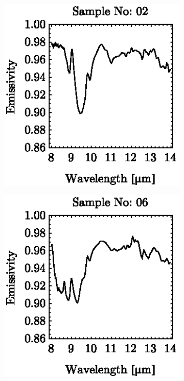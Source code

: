 \begin{figure}[!t]
	\centering
	\vspace{1em}
	\begin{subfigure}[t]{.3\linewidth}
		\centering
		\includegraphics[scale=1]{pics/Chapter_05/Sample_no_02.eps}
		\caption{}
	\end{subfigure}
	\hspace{1em}
	\begin{subfigure}[t]{.3\linewidth}
		\centering
		\includegraphics[scale=1]{pics/Chapter_05/Sample_no_06.eps}
		\caption{}
	\end{subfigure}
	\hspace{1em}
	\begin{subfigure}[t]{.3\linewidth}
		\centering

\end{subfigure}
\end{figure}
